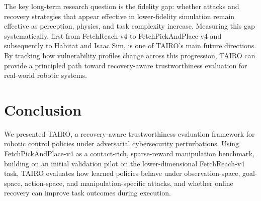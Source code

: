 \documentclass[conference]{IEEEtran}
\begin{document}
The key long-term research question is the fidelity gap: whether attacks and recovery
strategies that appear effective in lower-fidelity simulation remain effective as
perception, physics, and task complexity increase. Measuring this gap systematically,
first from FetchReach-v4 to FetchPickAndPlace-v4 and subsequently to Habitat and Isaac
Sim, is one of TAIRO's main future directions. By tracking how vulnerability profiles
change across this progression, TAIRO can provide a principled path toward
recovery-aware trustworthiness evaluation for real-world robotic systems.


\section{Conclusion}
\label{sec:conclusion}

We presented TAIRO, a recovery-aware trustworthiness evaluation framework for robotic
control policies under adversarial cybersecurity perturbations. Using FetchPickAndPlace-v4
as a contact-rich, sparse-reward manipulation benchmark, building on an initial
validation pilot on the lower-dimensional FetchReach-v4 task, TAIRO evaluates how
learned policies behave under observation-space, goal-space, action-space, and
manipulation-specific attacks, and whether online recovery can improve task outcomes
during execution.
\end{document}
